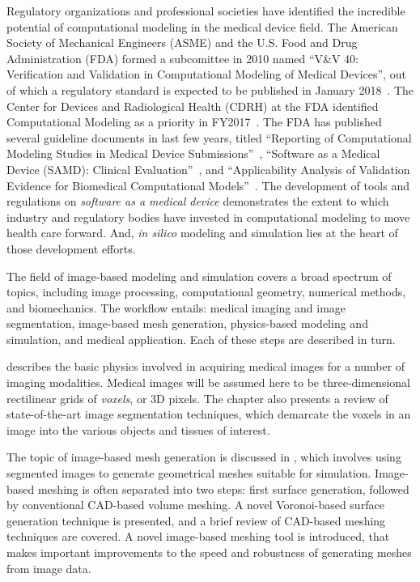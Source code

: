 Regulatory organizations and professional societies have identified the incredible potential of computational modeling in the medical device field. The American Society of Mechanical Engineers (ASME) and the U.S. Food and Drug Administration (FDA) formed a subcomittee in 2010 named ``V\&V 40: Verification and Validation in Computational Modeling of Medical Devices'', out of which a regulatory standard is expected to be published in January 2018~\cite{committee}. The Center for Devices and Radiological Health (CDRH) at the FDA identified Computational Modeling as a priority in FY2017~\cite{Morrison2017}. The FDA has published several guideline documents in last few years, titled ``Reporting of Computational Modeling Studies in Medical Device Submissions''~\cite{fda1_2016}, ``Software as a Medical Device (SAMD): Clinical Evaluation''~\cite{fda1_2016}, and ``Applicability Analysis of Validation Evidence for Biomedical Computational Models''~\cite{pathmanathan_2017}. The development of tools and regulations on \textit{software as a medical device} demonstrates the extent to which industry and regulatory bodies have invested in computational modeling to move health care forward. And, \textit{in silico} modeling and simulation lies at the heart of those development efforts.


The field of image-based modeling and simulation covers a broad spectrum of topics, including image processing, computational geometry, numerical methods, and biomechanics. The workflow entails: medical imaging and image segmentation, image-based mesh generation, physics-based modeling and simulation, and medical application. Each of these steps are described in turn.

 describes the basic physics involved in acquiring medical images for a number of imaging modalities. Medical images will be assumed here to be three-dimensional rectilinear grids of \textit{voxels}, or 3D pixels. The chapter also presents a review of state-of-the-art image segmentation techniques, which demarcate the voxels in an image into the various objects and tissues of interest.

The topic of image-based mesh generation is discussed in , which involves using segmented images to generate  geometrical meshes suitable for simulation. Image-based meshing is often separated into two steps: first surface generation,  followed by conventional CAD-based volume meshing. A novel Voronoi-based surface generation technique is presented, and a brief review of CAD-based meshing techniques are covered. A novel image-based meshing tool is introduced, that makes important improvements to the speed and robustness of generating meshes from image data.

